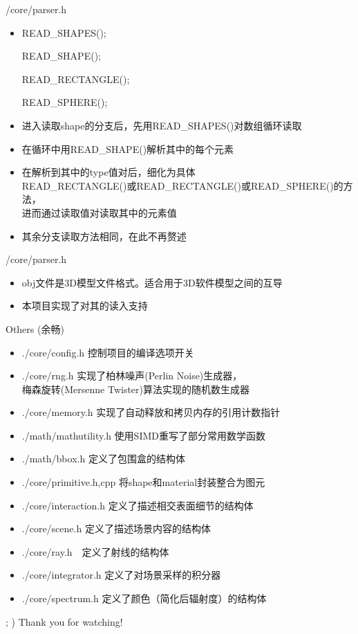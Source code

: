 \documentclass{beamer}
\begin{document}
\begin{frame} {/core/parser.h}
\begin{itemize}
\item \begin{semiverbatim}  READ\_SHAPES(); \end{semiverbatim}
\begin{semiverbatim} READ\_SHAPE(); \end{semiverbatim}
\begin{semiverbatim} READ\_RECTANGLE(); \end{semiverbatim}
\begin{semiverbatim} READ\_SPHERE(); \end{semiverbatim}
\item 进入读取shape的分支后，先用READ\_SHAPES()对数组循环读取
\item 在循环中用READ\_SHAPE()解析其中的每个元素
\item 在解析到其中的type值对后，细化为具体 \\ READ\_RECTANGLE()或READ\_RECTANGLE()或READ\_SPHERE()的方法， \\ 进而通过读取值对读取其中的元素值
\item 其余分支读取方法相同，在此不再赘述
\end{itemize}
\end{frame}

\begin{frame} {/core/parser.h}
\begin{itemize}
\item obj文件是3D模型文件格式。适合用于3D软件模型之间的互导
\item 本项目实现了对其的读入支持
\end{itemize}
\end{frame}

\begin{frame} {Others (余畅)}
\begin{itemize}

\item ./core/config.h 控制项目的编译选项开关
\item ./core/rng.h 实现了柏林噪声(Perlin Noise)生成器，\\ 梅森旋转(Mersenne Twister)算法实现的随机数生成器
\item ./core/memory.h 实现了自动释放和拷贝内存的引用计数指针
\item ./math/mathutility.h 使用SIMD重写了部分常用数学函数
\item ./math/bbox.h 定义了包围盒的结构体
\item ./core/primitive.h,cpp 将shape和material封装整合为图元
\item ./core/interaction.h 定义了描述相交表面细节的结构体
\item ./core/scene.h 定义了描述场景内容的结构体
\item ./core/ray.h　定义了射线的结构体
\item ./core/integrator.h 定义了对场景采样的积分器
\item ./core/spectrum.h 定义了颜色（简化后辐射度）的结构体
\end{itemize}
\end{frame}

\begin{frame} {; )}
Thank you for watching!
\end{frame}
\end{document}
